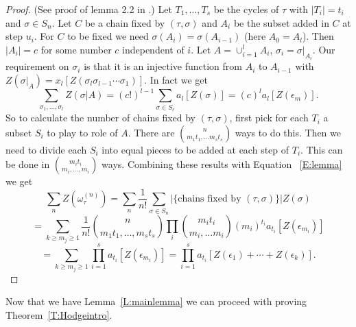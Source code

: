 \documentclass{amsart}
\begin{document}
\begin{proof} (See proof of lemma 2.2 in \cite{Hanlon}.)
  Let $T_1, \ldots, T_s$ be the cycles of $\tau$ with $|T_i| = t_i$ and $\sigma \in S_n$. 
  Let $C$ be a chain fixed by $(\tau, \sigma)$ and $A_i$
  be the subset added in $C$ at step $u_i$. For $C$ to be fixed we need $\sigma(A_i) = \sigma(A_{i-1})$ (here $A_0 = A_l$).
  Then $|A_i| = c$ for some number $c$ independent of $i$. Let $A = \cup_{i=1}^l A_i$, $\sigma_i = \sigma|_{A_i}$. Our 
  requirement on $\sigma_i$ is that  it is an injective function from $A_i$ to $A_{i-1}$ with $Z(\sigma|_A) = x_l[Z(
  \sigma_l \sigma_{l-1} \cdots \sigma_1)]$. In fact we get 
  \begin{equation} \label{E:lemma}
    \sum_{\sigma_1, \ldots, \sigma_l} Z(\sigma|A) = (c!)^{l-1} \sum_{\sigma \in S_c} a_l[Z(\sigma)] = 
    (c)^l a_l[Z(\epsilon_m)].
  \end{equation}
  So to calculate the number of chains fixed by $(\tau, \sigma)$, first pick for each $T_i$ a subset $S_i$ to play to role
  of $A$. There are ${n \choose m_1t_1, \ldots m_st_s}$  ways to do this. Then we need to divide each $S_i$ into equal 
  pieces to be added at each step of $T_i$. This can be done in ${m_it_i \choose m_i, \ldots, m_i}$ ways. Combining these
  results with Equation ~\ref{E:lemma} we get $$\sum_n Z(\omega^{(n)}_\tau) = \sum_n \frac{1}{n!} \sum_{\sigma \in S_n}
  |\{\mbox{chains fixed by }(\tau, \sigma)\}|Z(\sigma)$$ $$ = \sum_{k \ge m_j \ge 1} \frac{1}{n!} 
  {n \choose m_1t_1, \ldots, 
  m_st_s}\prod_i {m_it_i \choose m_i, \ldots m_i} (m_i)^{t_i} a_{t_i}[Z(\epsilon_{m_i})]$$ $$ = \sum_{k \ge m_j \ge 1} 
  \prod_{i=1}^s 
  a_{t_i}[Z(\epsilon_{m_i})] = \prod_{i=1}^s a_{t_i}[Z(\epsilon_1) + \cdots + Z(\epsilon_k)].$$
\end{proof}

Now that we have Lemma~\ref{L:mainlemma} we can proceed with proving Theorem~\ref{T:Hodgeintro}.
\end{document}
